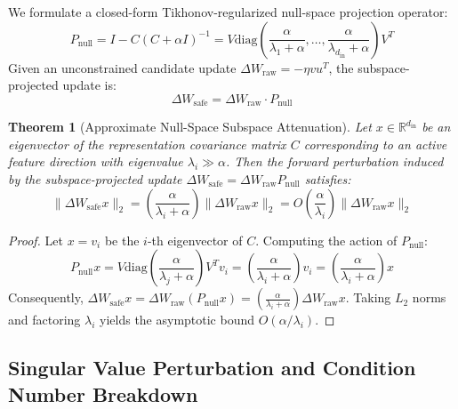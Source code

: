 \documentclass[11pt,a4paper]{article}
\newtheorem{theorem}{Theorem}
\begin{document}
We formulate a closed-form Tikhonov-regularized null-space projection operator:
\begin{equation}
P_{\text{null}} = I - C (C + \alpha I)^{-1} = V \text{diag}\left( \frac{\alpha}{\lambda_1 + \alpha}, \dots, \frac{\alpha}{\lambda_{d_{\text{in}}} + \alpha} \right) V^T
\end{equation}
Given an unconstrained candidate update $\Delta W_{\text{raw}} = -\eta v u^T$, the subspace-projected update is:
\begin{equation}
\Delta W_{\text{safe}} = \Delta W_{\text{raw}} \cdot P_{\text{null}}
\end{equation}

\begin{theorem}[Approximate Null-Space Subspace Attenuation]
Let $x \in \mathbb{R}^{d_{\text{in}}}$ be an eigenvector of the representation covariance matrix $C$ corresponding to an active feature direction with eigenvalue $\lambda_i \gg \alpha$. Then the forward perturbation induced by the subspace-projected update $\Delta W_{\text{safe}} = \Delta W_{\text{raw}} P_{\text{null}}$ satisfies:
\begin{equation}
\|\Delta W_{\text{safe}} x\|_2 = \left( \frac{\alpha}{\lambda_i + \alpha} \right) \|\Delta W_{\text{raw}} x\|_2 = O\left( \frac{\alpha}{\lambda_i} \right) \|\Delta W_{\text{raw}} x\|_2
\end{equation}
\end{theorem}

\begin{proof}
Let $x = v_i$ be the $i$-th eigenvector of $C$. Computing the action of $P_{\text{null}}$:
\begin{equation}
P_{\text{null}} x = V \text{diag}\left( \frac{\alpha}{\lambda_j + \alpha} \right) V^T v_i = \left( \frac{\alpha}{\lambda_i + \alpha} \right) v_i = \left( \frac{\alpha}{\lambda_i + \alpha} \right) x
\end{equation}
Consequently, $\Delta W_{\text{safe}} x = \Delta W_{\text{raw}} (P_{\text{null}} x) = \left( \frac{\alpha}{\lambda_i + \alpha} \right) \Delta W_{\text{raw}} x$. Taking $L_2$ norms and factoring $\lambda_i$ yields the asymptotic bound $O(\alpha / \lambda_i)$.
\end{proof}

\subsection{Singular Value Perturbation and Condition Number Breakdown}
\end{document}
